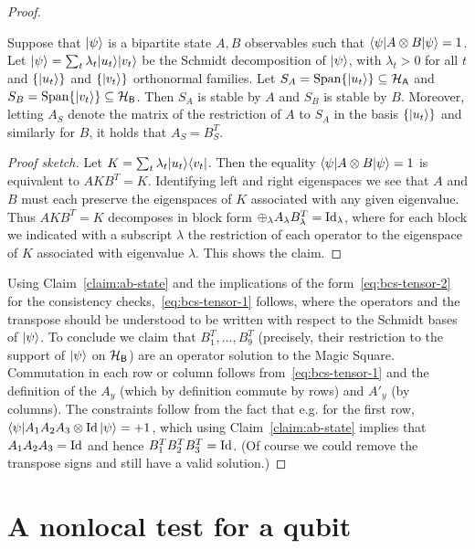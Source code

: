 \begin{proof}
\begin{claim}\label{claim:ab-state}
Suppose that $|\psi\rangle$ is a bipartite state $A,B$ observables such that $\langle\psi| A\otimes B |\psi\rangle = 1$. Let $|\psi\rangle = \sum_t \lambda_t |u_t\rangle |v_t\rangle$ be the Schmidt decomposition of $|\psi\rangle$, with $\lambda_t>0$ for all $t$ and $\{|u_t\rangle\}$ and $\{|v_t\rangle\}$ orthonormal families. Let  $S_A = \text{Span}\{|u_t\rangle\} \subseteq \mathcal{H}_{\textsf{A}}$ and $S_B=\text{Span}\{|v_t\rangle\} \subseteq \mathcal{H}_{\textsf{B}}$. Then $S_A$ is stable by $A$ and $S_B$ is stable by $B$. Moreover, letting $A_S$ denote the matrix of the restriction of $A$ to $S_A$ in the basis $\{|u_t\rangle\}$ and similarly for $B$, it holds that    $A_S=B_S^T$. 
\end{claim}

\begin{proof}[Proof sketch]
Let $K = \sum_t \lambda_t |u_t\rangle\langle v_t|$. Then the equality $\langle\psi| A\otimes B |\psi\rangle = 1$ is equivalent to $AKB^T = K$. Identifying left and right eigenspaces we see that $A$ and $B$ must each preserve the eigenspaces of $K$ associated with any given eigenvalue. Thus $AKB^T = K$ decomposes in block form $\oplus_\lambda  A_\lambda B_\lambda^T = \mathop{\rm Id}\nolimits_\lambda$, where for each block we indicated with a subscript $\lambda$ the restriction of each operator to the eigenspace of $K$ associated with eigenvalue $\lambda$. This shows the claim.  
\end{proof}

Using Claim~\ref{claim:ab-state} and the implications of the form~\eqref{eq:bcs-tensor-2} for the consistency checks,~\eqref{eq:bcs-tensor-1} follows, where the operators and the transpose should be understood to be written with respect to the Schmidt bases of $|\psi\rangle$. To conclude we claim that $B_1^T,\ldots,B_9^T$ (precisely, their restriction to the support of $|\psi\rangle$ on $\mathcal{H}_{\textsf{B}}$) are an operator solution to the Magic Square. Commutation in each row or column follows from~\eqref{eq:bcs-tensor-1} and the definition of the $A_y$ (which by definition commute by rows) and $A'_y$ (by columns). The constraints follow from the fact that e.g. for the first row, $\langle\psi| A_1 A_2 A_3 \otimes \mathop{\rm Id}\nolimits|\psi\rangle = +1$, which using Claim~\ref{claim:ab-state}  implies that $A_1A_2A_3 = \mathop{\rm Id}\nolimits$ and hence $B_1^T B_2^T B_3^T = \mathop{\rm Id}\nolimits$. (Of course we could remove the transpose signs and still have a valid solution.)
\end{proof}

\section{A nonlocal test for a qubit}
\label{nonlocal-qubit-test}

